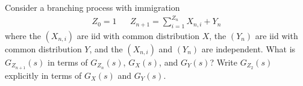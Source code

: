 \begin{solution}[Solution]
    
\end{solution}


\begin{problem}[Exercise 3.4]
Consider a branching process with immigration
\begin{align*}
    Z_0=1 && Z_{n+1}=\sum_{i=1}^{Z_n}X_{n,i}+Y_n
\end{align*}
where the \( (X_{n,i}) \) are iid with common distribution \( X \), the \( (Y_n) \) are iid with common distribution \( Y \), and the \( (X_{n,i}) \) and \( (Y_n) \) are independent. What is \( G_{Z_{n+1}}(s) \) in terms of \( G_{Z_n}(s)\), \( G_X(s) \), and \( G_Y(s) \)? Write \( G_{Z_2}(s) \) explicitly in terms of \( G_X(s) \) and \( G_Y(s) \).
\end{problem}

